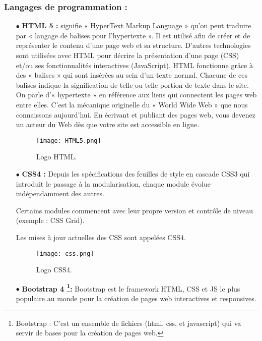 \subsubsection{Langages de programmation :}

\begin{itemize}
	\item[$\bullet$] \textbf{HTML 5 :} 	
 signifie « HyperText Markup Language » qu’on peut traduire par « langage de
balises pour l’hypertexte ». Il est utilisé afin de créer et de représenter le contenu d’une
page web et sa structure. D’autres technologies sont utilisées avec HTML pour décrire la
présentation d’une page (CSS) et/ou ses fonctionnalités interactives (JavaScript).
HTML fonctionne grâce à des « balises » qui sont insérées au sein d’un texte normal.
Chacune de ces balises indique la signification de telle ou telle portion de texte dans
le site. On parle d’« hypertexte » en référence aux liens qui connectent les pages web
entre elles. C’est la mécanique originelle du « World Wide Web » que nous connaissons
aujourd’hui. En écrivant et publiant des pages web, vous devenez un acteur du Web dès
que votre site est accessible en ligne.\cite{wiki:Hypertext_Markup_Language}
	\begin{figure}[ht]
		\centering
		\texttt{[image: HTML5.png]}
		\caption{Logo HTML.}
		\label{fig:HTML5 }
	\end{figure}
	\FloatBarrier	
	\medskip
	

		\item[$\bullet$] \textbf{CSS4 :} 
Depuis les spécifications des feuilles de style en cascade CSS3 qui introduit le passage à la modularisation, chaque module évolue indépendamment des autres.

Certains modules commencent avec leur propre version et contrôle de niveau (exemple : CSS Grid).

Les mises à jour actuelles des CSS sont appelées CSS4.\cite{wiki:Feuilles_de_style_en_cascade}
		\begin{figure}[ht]
			\centering
			\texttt{[image: css.png]}
			\caption{Logo CSS4.}
			\label{fig:CSS4 }
		\end{figure}
		\FloatBarrier
		
		\medskip
	
		
	\item[$\bullet$] \textbf{Bootstrap 4 \footnote{Bootstrap : C’est un ensemble de fichiers (html, css, et javascript) qui va servir de bases pour la création de pages web.}:} 
Bootstrap est le framework HTML, CSS et JS le plus populaire au monde pour la création de pages web interactives et responsives.


\end{itemize}
